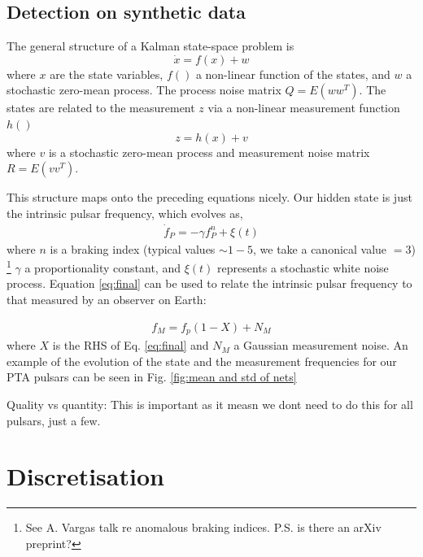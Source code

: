 \documentclass[fleqn,usenatbib,useAMS]{mnras}
\begin{document}
\subsection{Detection on synthetic data}







\noindent The general structure of a Kalman state-space problem is
\begin{equation}
	\dot{x} = f(x) + w
\end{equation}
where $x$ are the state variables, $f()$ a non-linear function of the states, and $w$ a stochastic zero-mean process. The process noise matrix $Q = E(w w^T)$. The states are related to the measurement $z$ via a non-linear measurement function $h()$
\begin{equation}
	z = h(x) + v
\end{equation}
where $v$ is a stochastic zero-mean process and measurement noise matrix $R = E(v v^T)$. \newline 


\noindent This structure maps onto the preceding equations nicely. Our hidden state is just the intrinsic pulsar frequency, which evolves as,
\begin{eqnarray}
	\dot{f}_P = -\gamma f_P^n + \xi(t)
\end{eqnarray}
where $n$ is a braking index (typical values $\sim 1-5$, we take a canonical value $=3$) \footnote{See A. Vargas talk re anomalous braking indices. P.S. is there an arXiv preprint?} $\gamma$ a proportionality constant, and $\xi(t)$ represents a stochastic white noise process. Equation \ref{eq:final} can be used to relate the intrinsic pulsar frequency to that measured by an observer on Earth:

\begin{eqnarray}
	f_M = f_p(1 - X) + N_M
\end{eqnarray}
where $X$ is the RHS of Eq. \ref{eq:final} and $N_M$ a Gaussian measurement noise. An example of the evolution of the state and the measurement frequencies for our PTA pulsars can be seen in Fig. \ref{fig:mean and std of nets}



Quality vs quantity: 
This is important as it measn we dont need to do this for all pulsars, just a few. 





\section{Discretisation}
\end{document}
